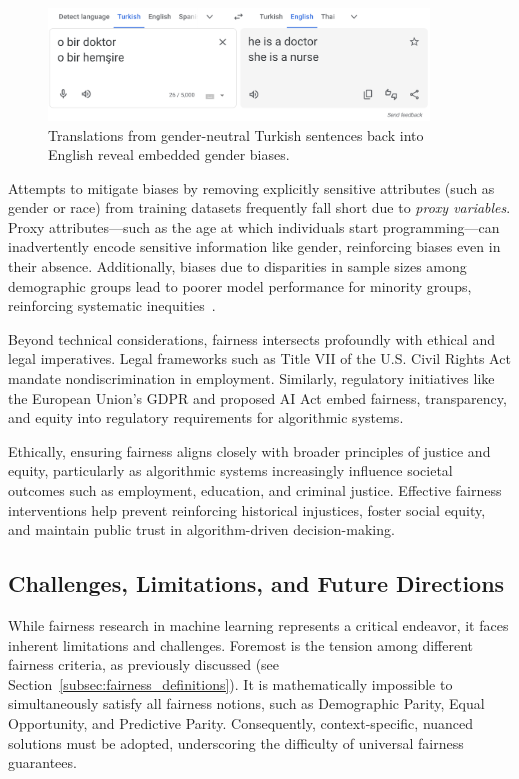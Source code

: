  \begin{figure}[h]
     \centering
     \includegraphics[width=0.9\textwidth]{sections/background/turkish-to-eng.png}
     \caption{Translations from gender-neutral Turkish sentences back into English reveal embedded gender biases.}
     \label{fig:turkish-to-eng}
 \end{figure}
 
 Attempts to mitigate biases by removing explicitly sensitive attributes (such as gender or race) from training datasets frequently fall short due to \textit{proxy variables}. Proxy attributes—such as the age at which individuals start programming—can inadvertently encode sensitive information like gender, reinforcing biases even in their absence. Additionally, biases due to disparities in sample sizes among demographic groups lead to poorer model performance for minority groups, reinforcing systematic inequities~\cite{barocas2016big}.
 
 Beyond technical considerations, fairness intersects profoundly with ethical and legal imperatives. Legal frameworks such as Title VII of the U.S. Civil Rights Act mandate nondiscrimination in employment. Similarly, regulatory initiatives like the European Union’s GDPR and proposed AI Act embed fairness, transparency, and equity into regulatory requirements for algorithmic systems.
 
 Ethically, ensuring fairness aligns closely with broader principles of justice and equity, particularly as algorithmic systems increasingly influence societal outcomes such as employment, education, and criminal justice. Effective fairness interventions help prevent reinforcing historical injustices, foster social equity, and maintain public trust in algorithm-driven decision-making.
 
 \subsection{Challenges, Limitations, and Future Directions}\label{subsec:challenges_future}
 
 While fairness research in machine learning represents a critical endeavor, it faces inherent limitations and challenges. Foremost is the tension among different fairness criteria, as previously discussed (see Section~\ref{subsec:fairness_definitions}). It is mathematically impossible to simultaneously satisfy all fairness notions, such as Demographic Parity, Equal Opportunity, and Predictive Parity. Consequently, context-specific, nuanced solutions must be adopted, underscoring the difficulty of universal fairness guarantees.
 
